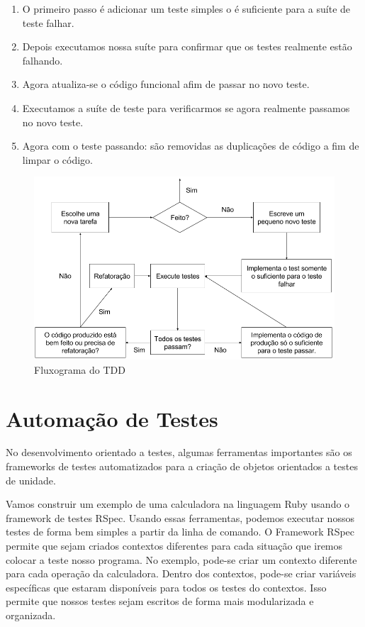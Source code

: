 \documentclass[12pt]{article}
\begin{document}
  \begin{enumerate}
    \item O primeiro passo é adicionar um teste simples o é suficiente 
    para a suíte de teste falhar.
    \item Depois executamos nossa suíte para confirmar que os testes realmente 
    estão falhando.
    \item Agora atualiza-se o código funcional afim de passar no novo teste.
    \item Executamos a suíte de teste para verificarmos se agora realmente 
    passamos no novo teste.
    \item Agora com o teste passando: são removidas as duplicações de código 
    a fim de limpar o código.
  \end{enumerate}

  \begin{figure}[H]
    \centering
    \includegraphics[scale=0.4]{tdd}
    \caption{Fluxograma do TDD}
  \end{figure}

  \section{Automação de Testes}

  No desenvolvimento orientado a testes, algumas ferramentas importantes são
  os frameworks de testes automatizados para a criação de objetos orientados
  a testes de unidade. 

  Vamos construir um exemplo de uma calculadora 
  na linguagem Ruby usando o framework de testes RSpec.
  Usando essas ferramentas, podemos executar nossos testes de forma bem simples a
  partir da linha de comando. O Framework RSpec permite que sejam criados contextos
  diferentes para cada situação que iremos colocar a teste nosso programa. No exemplo,
  pode-se criar um contexto diferente para cada operação da calculadora. Dentro dos
  contextos, pode-se criar variáveis específicas que estaram disponíveis para todos 
  os testes do contextos. Isso permite que nossos testes sejam escritos de forma 
  mais modularizada e organizada.
\end{document}
